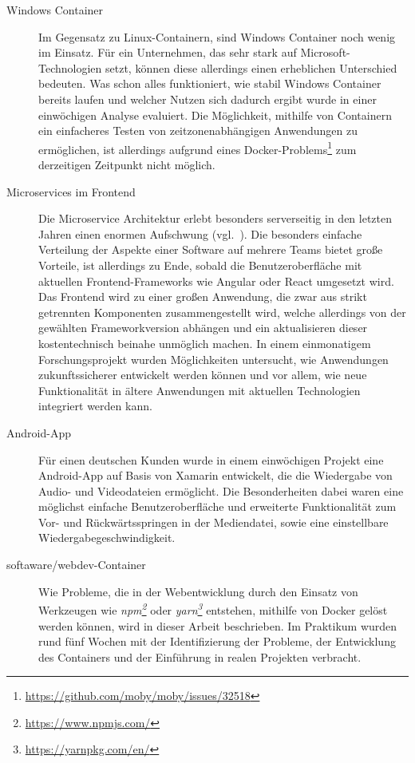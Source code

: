 \begin{description}
    \item [Windows Container]
    Im Gegensatz zu Linux-Containern, sind Windows Container noch wenig im Einsatz.
    Für ein Unternehmen, das sehr stark auf Microsoft-Technologien setzt, können diese allerdings einen erheblichen Unterschied bedeuten.
    Was schon alles funktioniert, wie stabil Windows Container bereits laufen und welcher Nutzen sich dadurch ergibt wurde in einer einwöchigen Analyse evaluiert.
    Die Möglichkeit, mithilfe von Containern ein einfacheres Testen von zeitzonenabhängigen Anwendungen zu ermöglichen, ist allerdings aufgrund eines Docker-Problems\footnote{\url{https://github.com/moby/moby/issues/32518}} zum derzeitigen Zeitpunkt nicht möglich.
    \item [Microservices im Frontend]
    Die Microservice Architektur erlebt besonders serverseitig in den letzten Jahren einen enormen Aufschwung (vgl.~\autocite{Fowler.Microservices:online}).
    Die besonders einfache Verteilung der Aspekte einer Software auf mehrere Teams bietet große Vorteile, ist allerdings zu Ende, sobald die Benutzeroberfläche mit aktuellen Frontend-Frameworks wie Angular oder React umgesetzt wird.
    Das Frontend wird zu einer großen Anwendung, die zwar aus strikt getrennten Komponenten zusammengestellt wird, welche allerdings von der gewählten Frameworkversion abhängen und ein aktualisieren dieser kostentechnisch beinahe unmöglich machen.
    In einem einmonatigem Forschungsprojekt wurden Möglichkeiten untersucht, wie Anwendungen zukunftssicherer entwickelt werden können und vor allem, wie neue Funktionalität in ältere Anwendungen mit aktuellen Technologien integriert werden kann.
    \item [Android-App]
    Für einen deutschen Kunden wurde in einem einwöchigen Projekt eine Android-App auf Basis von Xamarin entwickelt, die die Wiedergabe von Audio- und Videodateien ermöglicht.
    Die Besonderheiten dabei waren eine möglichst einfache Benutzeroberfläche und erweiterte Funktionalität zum Vor- und Rückwärtsspringen in der Mediendatei, sowie eine einstellbare Wiedergabegeschwindigkeit.
    \item [softaware/webdev-Container]
    Wie Probleme, die in der Webentwicklung durch den Einsatz von Werkzeugen wie \emph{npm\footnote{\url{https://www.npmjs.com/}}} oder \emph{yarn\footnote{\url{https://yarnpkg.com/en/}}} entstehen, mithilfe von Docker gelöst werden können, wird in dieser Arbeit beschrieben.
    Im Praktikum wurden rund fünf Wochen mit der Identifizierung der Probleme, der Entwicklung des Containers und der Einführung in realen Projekten verbracht.
\end{description}
